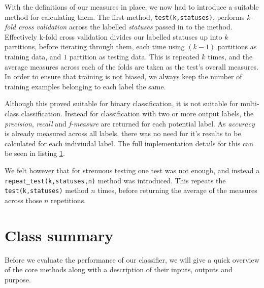 With the definitions of our measures in place, we now had to introduce a suitable method for calculating them. The first method, \texttt{test(k,statuses)}, performs \emph{k-fold cross validation} across the labelled \emph{statuses} passed in to the method. Effectively k-fold cross validation divides our labelled statuses up into $k$ partitions, before iterating through them, each time using $(k-1)$ partitions as training data, and $1$ partition as testing data. This is repeated $k$ times, and the average measures across each of the folds are taken as the test's overall measures. In order to ensure that training is not biased, we always keep the number of training examples belonging to each label the same.

Although this proved suitable for binary classification, it is not suitable for multi-class classification. Instead for classification with two or more output labels, the \emph{precision}, \emph{recall} and \emph{f-measure} are returned for each potential label. As \emph{accuracy} is already measured across all labels, there was no need for it's results to be calculated for each indiviudal label. The full implementation details for this can be seen in listing \ref{}.

We felt however that for strenuous testing one test was not enough, and instead a \texttt{repeat\_test(k,statuses,n)} method was introduced. This repeats the \texttt{test(k,statuses)} method $n$ times, before returning the average of the measures across those $n$ repetitions.

\section{Class summary}

Before we evaluate the performance of our classifier, we will give a quick overview of the core methods along with a description of their inputs, outputs and purpose.

